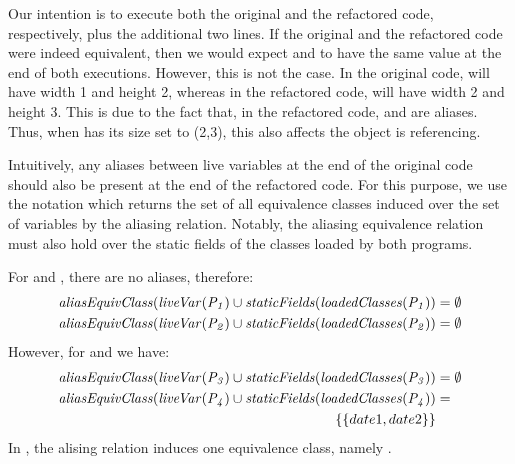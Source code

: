 \documentclass[sigconf,review,anonymous]{acmart}
\begin{document}
\begin{example}
Our intention is to execute both the original and the refactored code, respectively, plus the additional two lines.
If the original and the refactored code were indeed equivalent,
then we would expect  and  to have the same value at the end of both executions. 
However, this is not the case.
In the original code,  will have width 1 and height 2, whereas in the refactored code,
 will have width 2 and height 3. This is due to the fact that,
in the refactored code,  and  are aliases. %
Thus, when  has its size set to (2,3), this also affects the object  is referencing.
\end{example}  

Intuitively, any aliases between live variables at the end of the original code should also
be present at the end of the refactored code. For this purpose, we use the notation
 which returns the set of all equivalence classes induced over the
set of variables  by the aliasing relation.  
Notably, the aliasing equivalence relation must also hold over the
static fields of the classes loaded by both programs.


\begin{example}
For  and , there are no aliases, therefore:
\[
\begin{aligned}[t]
  \mathit{{aliasEquivClass(liveVar(P_1) \cup staticFields(loadedClasses(P_1))}} &= \emptyset\\
  \mathit{{aliasEquivClass(liveVar(P_2) \cup staticFields(loadedClasses(P_2))}} &= \emptyset
\end{aligned}
\]
%
However, for  and  we have:
\[
\begin{aligned}[t]
  \mathit{{aliasEquivClass(liveVar(P_3) \cup staticFields(loadedClasses(P_3))}} &= \emptyset\\
  \mathit{{aliasEquivClass(liveVar(P_4) \cup staticFields(loadedClasses(P_4))}} &= \\
  \qquad \{\{date1, date2\}\} &
\end{aligned}
\]
In , the alising relation induces one equivalence class, namely .

\end{example}
  
\end{document}
